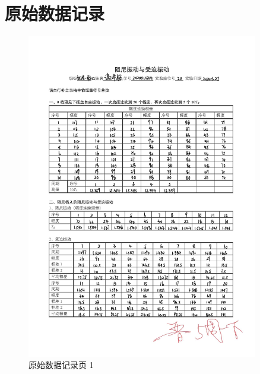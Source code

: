 \documentclass[12pt,a4paper]{amsart}
\begin{document}
\section{原始数据记录}

\begin{figure}[h]
	\centering
	\includegraphics[width=0.9\textwidth]{img/original_data_page_1.jpg}
	\caption{原始数据记录页 1}
	\label{fig:original_data_page_1}
\end{figure}
\end{document}
